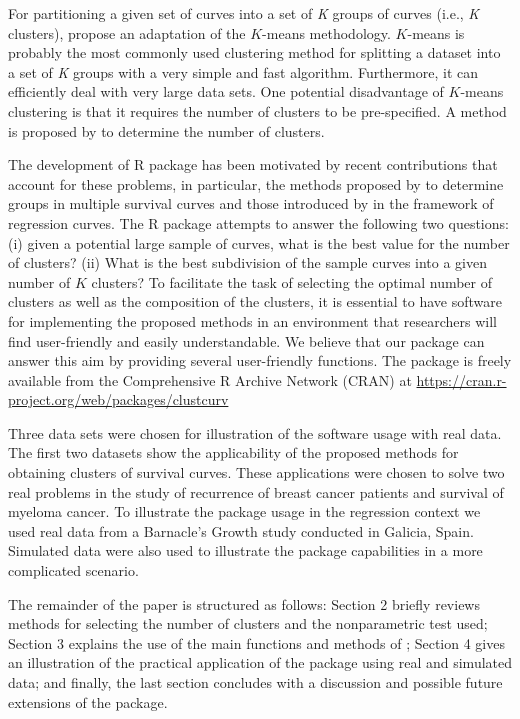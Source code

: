 For partitioning a given set of curves into a set of \textit{K} groups of curves (i.e., \textit{K} clusters), \citet{villanueva2019} propose an adaptation of the $K$-means methodology. $K$-means is probably the most commonly used clustering method for splitting a dataset into a set of \textit{K} groups with a very simple and fast algorithm. Furthermore, it can efficiently deal with very large data sets.     One potential disadvantage of $K$-means clustering is that it requires the number of clusters to be pre-specified. A method is proposed by \citet{villanueva2019} to determine the number of clusters. 


The development of  R package has been motivated by recent contributions that account for these problems, in particular, the methods proposed by \citet{villanueva2019} to determine groups in multiple survival curves and those introduced by \citet{nora_cluster} in the framework of regression curves. The  R package attempts to answer the following two questions: (i) given a potential large sample of curves, what is the best value for the number of clusters? (ii) What is the best subdivision of the sample curves into a given number of $K$ clusters? 
To facilitate the task of selecting the optimal number of clusters as well as the composition of the clusters, it is essential to have software for implementing the proposed methods in an environment that researchers will find user-friendly and easily understandable. We believe that our package can answer this aim by providing several user-friendly functions. The package  is freely available from the Comprehensive R Archive Network (CRAN) at \url{https://cran.r-project.org/web/packages/clustcurv}


Three data sets were chosen for illustration of the software usage with real data. The first two datasets show the applicability of the proposed methods for obtaining clusters of survival curves. These applications were chosen to solve two real problems in the study of recurrence of breast cancer patients and survival of myeloma cancer. To illustrate the package usage in the regression context we used real data from a Barnacle's Growth study conducted in Galicia, Spain. Simulated data were also used to illustrate the package capabilities in a more complicated scenario.


The remainder of the paper is structured as follows: Section 2 briefly reviews methods for selecting the number of clusters and the nonparametric test used; Section 3 explains the use of the main functions and methods of ; Section 4 gives an illustration of the practical application of the package using real and simulated data; and finally, the last section concludes with a discussion and possible future extensions of the package. 



